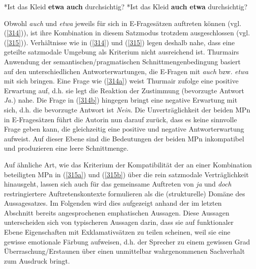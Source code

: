 \begin{exe}
	\ex\label{315} 
		\begin{xlist}	
			\ex\label{315a} *Ist das Kleid \textbf{etwa auch} durchsichtig?
			\hfill\hbox {\citet[27]{Thurmair1991}}
			\ex\label{315b} *Ist das Kleid \textbf{auch etwa} durchsichtig?
		\end{xlist}
\end{exe}
Obwohl \textit{auch} und \textit{etwa} jeweils für sich in E-Fragesätzen auftreten können (vgl. (\ref{314})), ist ihre Kombination in diesem Satzmodus trotzdem ausgeschlossen (vgl. (\ref{315})). Verhältnisse wie in (\ref{314}) und (\ref{315}) legen deshalb nahe, dass eine geteilte satzmodale Umgebung als Kriterium nicht ausreichend ist. Thurmairs Anwendung der semantischen/pragmatischen Schnittmengenbedingung basiert auf den unterschiedlichen Antworterwartungen, die E-Fragen mit \textit{auch} bzw. \textit{etwa} mit sich bringen. Eine Frage wie (\ref{314a}) weist Thurmair zufolge eine positive Erwartung auf, d.h. sie legt die Reaktion der Zustimmung (bevorzugte Antwort  \textit{Ja.}) nahe. Die Frage in (\ref{314b}) hingegen bringt eine negative Erwartung mit sich, d.h. die bevorzugte Antwort ist \textit{Nein}. Die Unverträglichkeit der beiden MPn in E-Fragesät\-zen führt die Autorin nun darauf zurück, dass es keine sinnvolle Frage geben kann, die gleichzeitig eine positive und negative Antworterwartung aufweist. Auf dieser Ebene sind die Bedeutungen der beiden MPn inkompatibel und produzieren eine leere Schnittmenge.			        
								               
Auf ähnliche Art, wie das Kriterium der Kompatibilität der an einer Kombination beteiligten MPn in (\ref{315a}) und (\ref{315b}) über die rein satzmodale Verträglichkeit hinausgeht, lassen sich auch für das gemeinsame Auftreten von \textit{ja} und \textit{doch} restringiertere Auftretenskontexte formulieren als die (strukturelle) Domäne des Aussagesatzes. Im Folgenden wird dies aufgezeigt anhand der im letzten Abschnitt bereits angesprochenen  emphatischen Aussagen. Diese Aussagen unterscheiden sich von typischeren Aussagen darin, dass sie auf funktionaler Ebene Eigenschaften mit Exklamativsätzen zu teilen scheinen, weil sie eine gewisse emotionale Färbung aufweisen, d.h. der Sprecher zu einem gewissen Grad Überraschung/Erstaunen über einen unmittelbar wahrgenommenen Sachverhalt zum Ausdruck bringt.
			   					         
